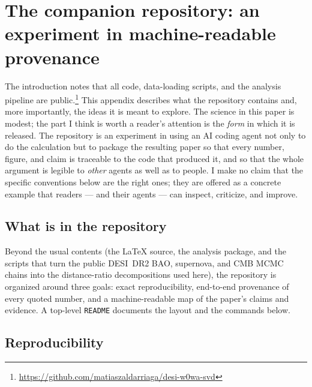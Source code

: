 
\section{The companion repository: an experiment in machine-readable provenance}
\label{app:reproducibility}

The introduction notes that all code, data-loading scripts, and the analysis
pipeline are public.\footnote{\url{https://github.com/matiaszaldarriaga/desi-w0wa-svd}}
This appendix describes what the repository contains and, more importantly, the
ideas it is meant to explore. The science in this paper is modest; the part I
think is worth a reader's attention is the \emph{form} in which it is released.
The repository is an experiment in using an AI coding agent not only to do the
calculation but to package the resulting paper so that every number, figure, and
claim is traceable to the code that produced it, and so that the whole argument
is legible to \emph{other} agents as well as to people. I make no claim that the
specific conventions below are the right ones; they are offered as a concrete
example that readers --- and their agents --- can inspect, criticize, and improve.

\subsection{What is in the repository}
\label{app:repo_contents}

Beyond the usual contents (the LaTeX source, the analysis package, and the
scripts that turn the public DESI~DR2 BAO, supernova, and CMB MCMC chains into
the distance-ratio decompositions used here), the repository is organized around
three goals: exact reproducibility, end-to-end provenance of every quoted number,
and a machine-readable map of the paper's claims and evidence. A top-level
\texttt{README} documents the layout and the commands below.

\subsection{Reproducibility}
\label{app:reproducibility_pipeline}

